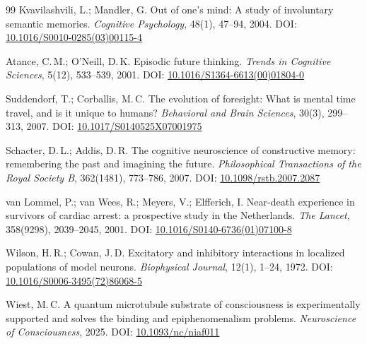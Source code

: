 \documentclass[11pt,a4paper]{article}
\begin{document}
\begin{thebibliography}{99}
Kvavilashvili, L.; Mandler, G.
\newblock Out of one's mind: A study of involuntary semantic memories.
\newblock \emph{Cognitive Psychology}, 48(1), 47--94, 2004.
\newblock DOI: \href{https://doi.org/10.1016/S0010-0285(03)00115-4}{10.1016/S0010-0285(03)00115-4}

Atance, C.\,M.; O'Neill, D.\,K.
\newblock Episodic future thinking.
\newblock \emph{Trends in Cognitive Sciences}, 5(12), 533--539, 2001.
\newblock DOI: \href{https://doi.org/10.1016/S1364-6613(00)01804-0}{10.1016/S1364-6613(00)01804-0}

Suddendorf, T.; Corballis, M.\,C.
\newblock The evolution of foresight: What is mental time travel, and is it
  unique to humans?
\newblock \emph{Behavioral and Brain Sciences}, 30(3), 299--313, 2007.
\newblock DOI: \href{https://doi.org/10.1017/S0140525X07001975}{10.1017/S0140525X07001975}

Schacter, D.\,L.; Addis, D.\,R.
\newblock The cognitive neuroscience of constructive memory: remembering the
  past and imagining the future.
\newblock \emph{Philosophical Transactions of the Royal Society B},
  362(1481), 773--786, 2007.
\newblock DOI: \href{https://doi.org/10.1098/rstb.2007.2087}{10.1098/rstb.2007.2087}

van Lommel, P.; van Wees, R.; Meyers, V.; Elfferich, I.
\newblock Near-death experience in survivors of cardiac arrest: a prospective
  study in the Netherlands.
\newblock \emph{The Lancet}, 358(9298), 2039--2045, 2001.
\newblock DOI: \href{https://doi.org/10.1016/S0140-6736(01)07100-8}{10.1016/S0140-6736(01)07100-8}

Wilson, H.\,R.; Cowan, J.\,D.
\newblock Excitatory and inhibitory interactions in localized populations of
  model neurons.
\newblock \emph{Biophysical Journal}, 12(1), 1--24, 1972.
\newblock DOI: \href{https://doi.org/10.1016/S0006-3495(72)86068-5}{10.1016/S0006-3495(72)86068-5}

Wiest, M.\,C.
\newblock A quantum microtubule substrate of consciousness is experimentally
  supported and solves the binding and epiphenomenalism problems.
\newblock \emph{Neuroscience of Consciousness}, 2025.
\newblock DOI: \href{https://doi.org/10.1093/nc/niaf011}{10.1093/nc/niaf011}


\end{thebibliography}
\end{document}
